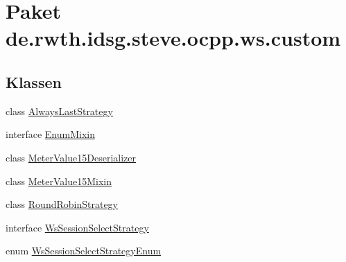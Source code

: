 \hypertarget{namespacede_1_1rwth_1_1idsg_1_1steve_1_1ocpp_1_1ws_1_1custom}{\section{Paket de.\+rwth.\+idsg.\+steve.\+ocpp.\+ws.\+custom}
\label{namespacede_1_1rwth_1_1idsg_1_1steve_1_1ocpp_1_1ws_1_1custom}
}
\subsection*{Klassen}
\begin{DoxyCompactItemize}
\item 
class \hyperlink{classde_1_1rwth_1_1idsg_1_1steve_1_1ocpp_1_1ws_1_1custom_1_1_always_last_strategy}{Always\+Last\+Strategy}
\item 
interface \hyperlink{interfacede_1_1rwth_1_1idsg_1_1steve_1_1ocpp_1_1ws_1_1custom_1_1_enum_mixin}{Enum\+Mixin}
\item 
class \hyperlink{classde_1_1rwth_1_1idsg_1_1steve_1_1ocpp_1_1ws_1_1custom_1_1_meter_value15_deserializer}{Meter\+Value15\+Deserializer}
\item 
class \hyperlink{classde_1_1rwth_1_1idsg_1_1steve_1_1ocpp_1_1ws_1_1custom_1_1_meter_value15_mixin}{Meter\+Value15\+Mixin}
\item 
class \hyperlink{classde_1_1rwth_1_1idsg_1_1steve_1_1ocpp_1_1ws_1_1custom_1_1_round_robin_strategy}{Round\+Robin\+Strategy}
\item 
interface \hyperlink{interfacede_1_1rwth_1_1idsg_1_1steve_1_1ocpp_1_1ws_1_1custom_1_1_ws_session_select_strategy}{Ws\+Session\+Select\+Strategy}
\item 
enum \hyperlink{enumde_1_1rwth_1_1idsg_1_1steve_1_1ocpp_1_1ws_1_1custom_1_1_ws_session_select_strategy_enum}{Ws\+Session\+Select\+Strategy\+Enum}
\end{DoxyCompactItemize}
